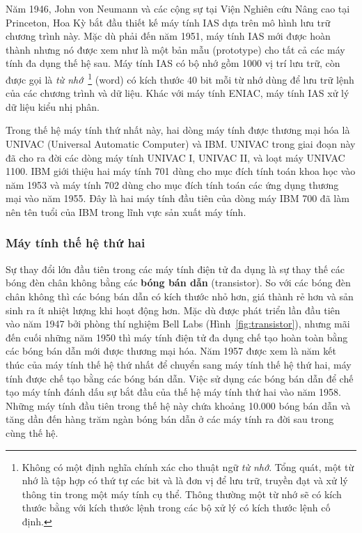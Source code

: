 Năm 1946, John von Neumann và các cộng sự tại Viện Nghiên cứu Nâng cao tại Princeton, Hoa Kỳ bắt đầu thiết kế máy tính IAS dựa trên mô hình lưu trữ chương trình này. Mặc dù phải đến năm 1951, máy tính IAS mới được hoàn thành nhưng nó được xem như là một bản mẫu (prototype) cho tất cả các máy tính đa dụng thế hệ sau. Máy tính IAS có bộ nhớ gồm 1000 vị trí lưu trữ, còn được gọi là \emph{từ nhớ}~\footnote{Không có một định nghĩa chính xác cho thuật ngữ \emph{từ nhớ}. Tổng quát, một từ nhớ là tập hợp có thứ tự các bit và là đơn vị để lưu trữ, truyền đạt và xử lý thông tin trong một máy tính cụ thể. Thông thường một từ nhớ sẽ có kích thước bằng với kích thước lệnh trong các bộ xử lý có kích thước lệnh cố định.} (word) có kích thước 40 bit mỗi từ nhớ dùng để lưu trữ lệnh của các chương trình và dữ liệu. Khác với máy tính ENIAC, máy tính IAS xử lý dữ liệu kiểu nhị phân.

Trong thế hệ máy tính thứ nhất này, hai dòng máy tính được thương mại hóa là UNIVAC (Universal Automatic Computer) và IBM. UNIVAC trong giai đoạn này đã cho ra đời các dòng máy tính UNIVAC I, UNIVAC II, và loạt máy UNIVAC 1100. IBM giới thiệu hai máy tính 701 dùng cho mục đích tính toán khoa học vào năm 1953 và máy tính 702 dùng cho mục đích tính toán các ứng dụng thương mại vào năm 1955. Đây là hai máy tính đầu tiên của dòng máy IBM 700 đã làm nên tên tuổi của IBM trong lĩnh vực sản xuất máy tính.

\subsubsection{Máy tính thế hệ thứ hai}

Sự thay đổi lớn đầu tiên trong các máy tính điện tử đa dụng là sự thay thế các bóng đèn chân không bằng các \textbf{bóng bán dẫn} (transistor). So với các bóng đèn chân không thì các bóng bán dẫn có kích thước nhỏ hơn, giá thành rẻ hơn và sản sinh ra ít nhiệt lượng khi hoạt động hơn. Mặc dù được phát triển lần đầu tiên vào năm 1947 bởi phòng thí nghiệm Bell Labs (Hình~\ref{fig:transistor}), nhưng mãi đến cuối những năm 1950 thì máy tính điện tử đa dụng chế tạo hoàn toàn bằng các bóng bán dẫn mới được thương mại hóa. Năm 1957 được xem là năm kết thúc của máy tính thế hệ thứ nhất để chuyển sang máy tính thế hệ thứ hai, máy tính được chế tạo bằng các bóng bán dẫn. Việc sử dụng các bóng bán dẫn để chế tạo máy tính đánh dấu sự bắt đầu của thế hệ máy tính thứ hai vào năm 1958. Những máy tính đầu tiên trong thế hệ này chứa khoảng 10.000 bóng bán dẫn và tăng dần đến hàng trăm ngàn bóng bán dẫn ở các máy tính ra đời sau trong cùng thế hệ.

